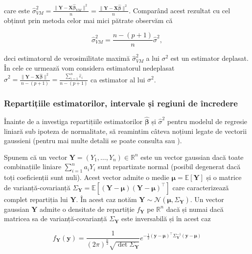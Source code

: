 \documentclass[]{article}
\begin{document}
care este
\(\hat{\sigma}_{VM}^2 = \frac{\lVert\boldsymbol Y - \boldsymbol X\hat{\boldsymbol\beta}_{VM}\rVert^2}{n}=\frac{\lVert\boldsymbol Y - \boldsymbol X\hat{\boldsymbol\beta}\rVert^2}{n}\).
Comparând acest rezultat cu cel obținut prin metoda celor mai mici
pătrate observăm că

\[
  \hat{\sigma}_{VM}^2 = \frac{n - (p+1)}{n}\hat{\sigma}^2, 
\]

deci estimatorul de verosimilitate maximă \(\hat{\sigma}_{VM}^2\) a lui
\(\sigma^2\) est un estimator deplasat. În cele ce urmează vom considera
estimatorul nedeplasat
\(\hat{\sigma}^2 = \frac{\lVert\boldsymbol Y - \boldsymbol X\hat{\boldsymbol\beta}\rVert^2}{n - (p+1)} = \frac{\sum_{i=1}^{n}\hat{\varepsilon}_i}{n - (p+1)}\)
ca estimator al lui \(\sigma^2\).

\subsubsection{Repartițiile estimatorilor, intervale și regiuni de
încredere}\label{repartitiile-estimatorilor-intervale-si-regiuni-de-incredere}

Înainte de a investiga repartițiile estimatorilor
\(\hat{\boldsymbol\beta}\) și \(\hat{\sigma}^2\) pentru modelul de
regresie liniară sub ipoteza de normalitate, să reamintim câteva noțiuni
legate de vectorii gaussieni (pentru mai multe detalii se poate consulta
\citep[Capitolul 2]{Seber2003} sau \citep[Capitolul 16]{Jacod2003}).

Spunem că un vector \(\boldsymbol Y = (Y_1,\ldots,Y_n)\in\mathbb{R}^n\)
este un vector gaussian dacă toate combinațiile liniare
\(\sum_{i=1}^{n}a_iY_i\) sunt repartizate normal (posibil degenerat dacă
toți coeficienții sunt nuli). Acest vector admite o medie
\(\boldsymbol\mu = \mathbb{E}[\boldsymbol Y]\) și o matrice de
varianță-covarianță
\(\Sigma_{\boldsymbol Y} = \mathbb{E}[(\boldsymbol Y - \boldsymbol\mu)(\boldsymbol Y - \boldsymbol\mu)^\intercal]\)
care caracterizează complet repartiția lui \(\boldsymbol Y\). În acest
caz notăm
\(\boldsymbol Y \sim\mathcal{N}(\boldsymbol\mu, \Sigma_{\boldsymbol Y})\).
Un vector gaussian \(\boldsymbol Y\) admite o densitate de repartiție
\(f_{\boldsymbol Y}\) pe \(\mathbb{R}^n\) dacă și numai dacă matricea sa
de varianță-covarianță \(\Sigma_{\boldsymbol Y}\) este inversabilă și în
acest caz

\[
  f_{\boldsymbol Y}(\boldsymbol y) = \frac{1}{(2\pi)^{\frac{n}{2}}\sqrt{\det{\Sigma_{\boldsymbol Y}}}} e^{-\frac{1}{2}(\boldsymbol y - \boldsymbol \mu)^\intercal \Sigma_{\boldsymbol Y}^{-1}(\boldsymbol y - \boldsymbol \mu)}
\]
\end{document}
